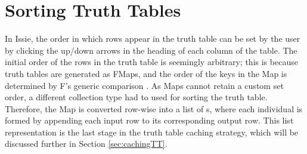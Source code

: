 
\section{Sorting Truth Tables}
In Issie, the order in which rows appear in the truth table can be set by the user by clicking the up/down arrows in the heading of each column of the table. The initial order of the rows in the truth table is seemingly arbitrary; this is because truth tables are generated as F\fsharp Maps, and the order of the keys in the Map is determined by F\fsharp's generic comparison \cite{fsmaps}. As Maps cannot retain a custom set order, a different collection type had to used for sorting the truth table. Therefore, the Map is converted row-wise into a list of s, where each individual  is formed by appending each input row to its corresponding output row. This list representation is the last stage in the truth table caching strategy, which will be discussed further in Section \ref{sec:cachingTT}.

